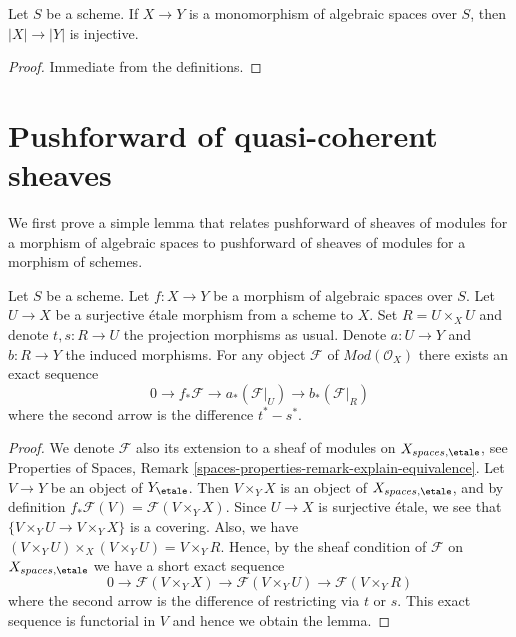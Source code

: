 \begin{lemma}
\label{lemma-monomorphism-injective-points}
Let $S$ be a scheme. If $X \to Y$ is a monomorphism of algebraic spaces
over $S$, then $|X| \to |Y|$ is injective.
\end{lemma}

\begin{proof}
Immediate from the definitions.
\end{proof}















\section{Pushforward of quasi-coherent sheaves}
\label{section-pushforward}

\noindent
We first prove a simple lemma that relates pushforward of sheaves of modules
for a morphism of algebraic spaces to pushforward of sheaves of modules for
a morphism of schemes.

\begin{lemma}
\label{lemma-compute-pushforward}
Let $S$ be a scheme.
Let $f : X \to Y$ be a morphism of algebraic spaces over $S$.
Let $U \to X$ be a surjective \'etale morphism from a scheme to $X$.
Set $R = U \times_X U$ and denote $t, s : R \to U$ the projection
morphisms as usual. Denote $a : U \to Y$ and $b : R \to Y$ the induced
morphisms. For any object $\mathcal{F}$ of $\textit{Mod}(\mathcal{O}_X)$
there exists an exact sequence
$$
0 \to f_*\mathcal{F} \to a_*(\mathcal{F}|_U) \to b_*(\mathcal{F}|_R)
$$
where the second arrow is the difference $t^* - s^*$.
\end{lemma}

\begin{proof}
We denote $\mathcal{F}$ also its extension to a sheaf of modules on
$X_{spaces, \etale}$, see
Properties of Spaces,
Remark \ref{spaces-properties-remark-explain-equivalence}.
Let $V \to Y$ be an object of $Y_\etale$. Then $V \times_Y X$ is an
object of $X_{spaces, \etale}$, and by definition
$f_*\mathcal{F}(V) = \mathcal{F}(V \times_Y X)$. Since $U \to X$ is
surjective \'etale, we see that $\{V \times_Y U \to V \times_Y X\}$
is a covering. Also, we have
$(V \times_Y U) \times_X (V \times_Y U) = V \times_Y R$.
Hence, by the sheaf condition of $\mathcal{F}$ on
$X_{spaces, \etale}$ we have a short exact sequence
$$
0 \to \mathcal{F}(V \times_Y X)
\to \mathcal{F}(V \times_Y U) \to \mathcal{F}(V \times_Y R)
$$
where the second arrow is the difference of restricting via $t$ or $s$.
This exact sequence is functorial in $V$ and hence we obtain the lemma.
\end{proof}

